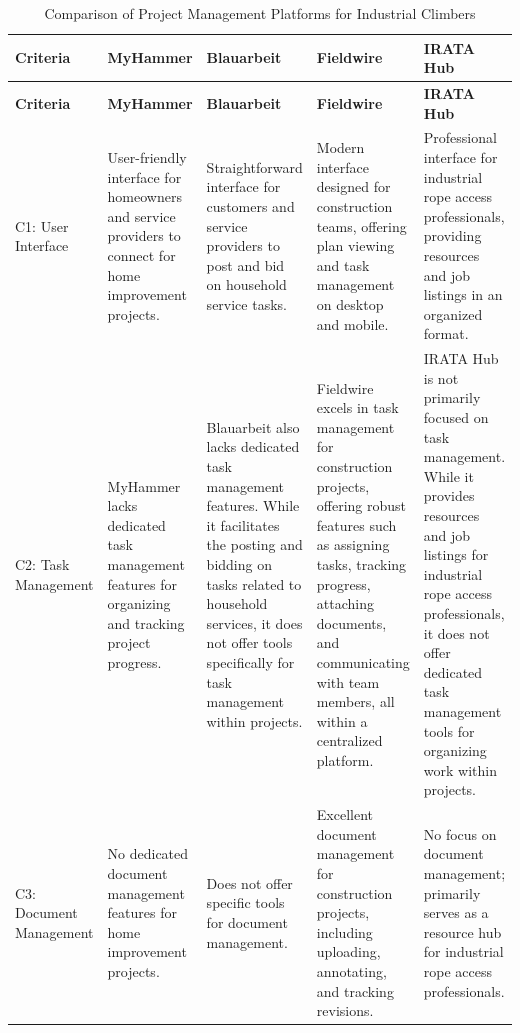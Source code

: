 \begin{longtable}{|p{2cm}|p{2.5cm}|p{2.5cm}|p{2.5cm}|p{2.5cm}|}
    \caption{Comparison of Project Management Platforms for Industrial Climbers} \\
    \hline
    \textbf{Criteria} & \textbf{MyHammer} & \textbf{Blauarbeit} & \textbf{Fieldwire} & \textbf{IRATA Hub} \\
    \hline
    \endfirsthead
    
    \hline
    \textbf{Criteria} & \textbf{MyHammer} & \textbf{Blauarbeit} & \textbf{Fieldwire} & \textbf{IRATA Hub} \\
    \hline
    \endhead
    
    \hline
     
    
    \hline
    \endlastfoot
    
    C1: User Interface &  User-friendly interface for homeowners and service providers to connect for home improvement projects. & Straightforward interface for customers and service providers to post and bid on household service tasks. & Modern interface designed for construction teams, offering plan viewing and task management on desktop and mobile. & Professional interface for industrial rope access professionals, providing resources and job listings in an organized format. \\ 
    \hline
    C2: Task Management & MyHammer lacks dedicated task management features for organizing and tracking project progress. & Blauarbeit also lacks dedicated task management features. While it facilitates the posting and bidding on tasks related to household services, it does not offer tools specifically for task management within projects. & Fieldwire excels in task management for construction projects, offering robust features such as assigning tasks, tracking progress, attaching documents, and communicating with team members, all within a centralized platform. & IRATA Hub is not primarily focused on task management. While it provides resources and job listings for industrial rope access professionals, it does not offer dedicated task management tools for organizing work within projects. \\
    \hline
    C3: Document Management & No dedicated document management features for home improvement projects. & Does not offer specific tools for document management. & Excellent document management for construction projects, including uploading, annotating, and tracking revisions. & No focus on document management; primarily serves as a resource hub for industrial rope access professionals. \\
    \hline
    

\end{longtable}
